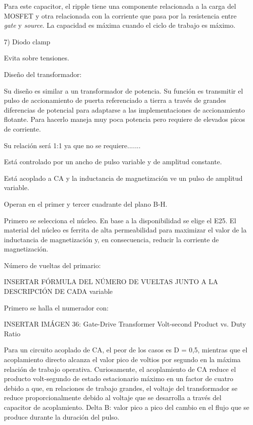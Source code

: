 Para este capacitor, el ripple tiene una componente relacionada a la carga del MOSFET 
y otra relacionada con la corriente que pasa por la resistencia entre \textit{gate} y \textit{source}. 
La capacidad es máxima cuando el ciclo de trabajo es máximo. 

7) Diodo clamp

Evita sobre tensiones.


Diseño del transformador:

Su diseño es similar a un transformador de potencia. 
Su función es transmitir el pulso de accionamiento de puerta referenciado a tierra a través de grandes diferencias de potencial para adaptarse a las implementaciones de accionamiento flotante. Para hacerlo maneja muy poca potencia pero requiere de elevados picos de corriente. 

Su relación será 1:1 ya que no se requiere.......

Está controlado por un ancho de pulso variable y de amplitud constante.

Está acoplado a CA y la inductancia de magnetización ve un pulso de amplitud variable.

Operan en el primer y tercer cuadrante del plano B-H.

Primero se selecciona el núcleo. En base a la disponibilidad se elige el E25. 
El material del núcleo es ferrita de alta permeabilidad para maximizar el valor de 
la inductancia de magnetización y, en consecuencia, reducir la corriente de magnetización.

Número de vueltas del primario: 

INSERTAR FÓRMULA DEL NÚMERO DE VUELTAS JUNTO A LA DESCRIPCIÓN DE CADA variable

Primero se halla el numerador con:

INSERTAR IMÁGEN 36: Gate-Drive Transformer Volt-second Product vs. Duty Ratio

Para un circuito acoplado de CA, el peor de los casos es D = 0,5, 
mientras que el acoplamiento directo alcanza el valor pico de voltios por segundo en la máxima relación de trabajo operativa. 
Curiosamente, el acoplamiento de CA reduce el producto volt-segundo de estado estacionario máximo en un factor de cuatro debido a que, 
en relaciones de trabajo grandes, el voltaje del transformador se reduce proporcionalmente debido al voltaje que 
se desarrolla a través del capacitor de acoplamiento.
Delta B: valor pico a pico del cambio en el flujo que se produce durante la duración del pulso. 

